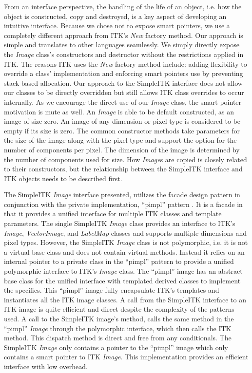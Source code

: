 \documentclass{frontiersMED} %
\begin{document}
From an interface perspective, the handling of the life of an object,
i.e. how the object is constructed, copy and destroyed, is a key
aspect of developing an intuitive interface. Because we chose not to
expose smart pointers, we use a completely different approach from
ITK's \textit{New} factory method. Our approach is simple and translates to other
languages seamlessly. We simply directly expose the \textit{Image} class's
constructors and destructor without the restrictions applied in
ITK. The reasons ITK uses the \textit{New} factory method include: adding
flexibility to override a class' implementation and enforcing smart
pointers use by preventing stack based allocation. Our approach to the
SimpleITK interface does not allow our classes to be directly
overridden but still allows ITK class overrides to occur
internally. As we encourage the direct use of our \textit{Image} class, the
smart pointer motivation is mute as well. An \textit{Image} is able to be
default constructed, as an image of size zero. An image of any
dimension or pixel type is considered to be empty if its size is
zero. The common constructor methods take parameters for the size of
the image along with the pixel type and support the option for the
number of components per pixel. The dimension of the image is
determined by the number of components used for size. How \textit{Image}s are
copied is closely related to their constructors, but the relationship
between the SimpleITK interface and ITK objects needs to be described
first.

The SimpleITK \textit{Image} interface presented, utilizes the facade design
pattern in conjunction with the private implementation, ``pimpl'' pattern
\cite{Sutter1999}. It is a facade in that it provides a unified interface
for multiple ITK classes and template parameters. The single SimpleITK
\textit{Image} class provides an interface to ITK's \textit{Image}, \textit{VectorImage}, and
\textit{LabelMap} classes and supports  multiple dimensions and pixel
types. However, the SimpleITK \textit{Image} class is not polymorphic, i.e. it
is not a virtual base class and does not contain virtual
methods. Instead it relies on an internal pointer to a private class
in the ``pimpl'' pattern to provide a unified polymorphic interface to
ITK's \textit{Image} class. The ``pimpl'' image has an abstract base class for the
unified interface with templated derived classes to implement the
specifics. This ``pimpl'' image fully encapsulate ITK's templates and
instantiates all the ITK image classes. A call from the SimpleITK
interface to an ITK image is quite efficient and direct despite the
complexity of the patterns used. A call to the SimpleITK image's
method, calls the same method in the ``pimpl'' \textit{Image} through the
polymorphic interface, which then calls the ITK method. This dispatch
method is direct and free from any conditionals. The SimpleITK \textit{Image}
only contains a pointer to the ``pimpl'' image which only contains a smart
pointer to ITK \textit{Image}. This implementation provides an efficient
interface with low overhead.
\end{document}
